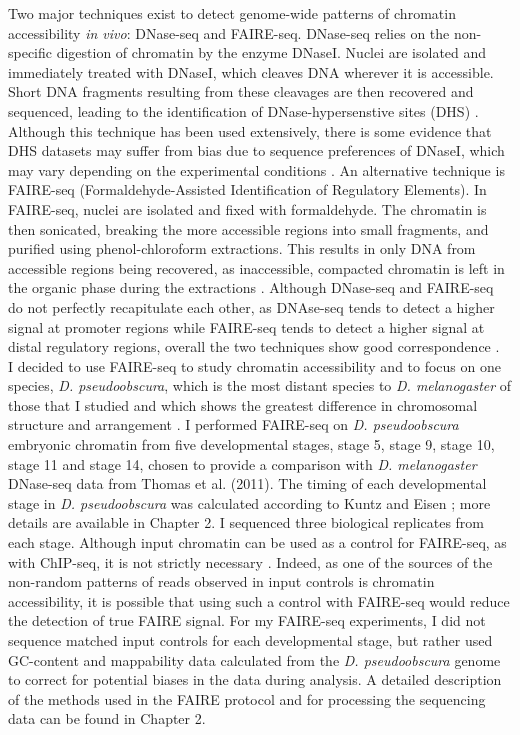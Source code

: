 Two major techniques exist to detect genome-wide patterns of chromatin accessibility \emph{in vivo}: DNase-seq and FAIRE-seq. DNase-seq relies on the non-specific digestion of chromatin by the enzyme DNaseI. Nuclei are isolated and immediately treated with DNaseI, which cleaves DNA wherever it is accessible. Short DNA fragments resulting from these cleavages are then recovered and sequenced, leading to the identification of DNase-hypersenstive sites (DHS) \citep{thomas_dynamic_2011}. Although this technique has been used extensively, there is some evidence that DHS datasets may suffer from bias due to sequence preferences of DNaseI, which may vary depending on the experimental conditions \citep{koohy_chromatin_2013}. An alternative technique is FAIRE-seq (Formaldehyde-Assisted Identification of Regulatory Elements). In FAIRE-seq, nuclei are isolated and fixed with formaldehyde. The chromatin is then sonicated, breaking the more accessible regions into small fragments, and purified using phenol-chloroform extractions. This results in only DNA from accessible regions being recovered, as inaccessible, compacted chromatin is left in the organic phase during the extractions \citep{giresi_isolation_2009, simon_using_2012}. Although DNase-seq and FAIRE-seq do not perfectly recapitulate each other, as DNAse-seq tends to detect a higher signal at promoter regions while FAIRE-seq tends to detect a higher signal at distal regulatory regions, overall the two techniques show good correspondence \citep{koohy_chromatin_2013, mckay_common_2013}.\\
   
I decided to use FAIRE-seq to study chromatin accessibility and to focus on one species, \emph{D. pseudoobscura}, which is the most distant species to \emph{D. melanogaster} of those that I studied and which shows the greatest difference in chromosomal structure and arrangement \citep{clark_evolution_2007,richards_comparative_2005}. I performed FAIRE-seq on \emph{D. pseudoobscura} embryonic chromatin from five developmental stages, stage 5, stage 9, stage 10, stage 11 and stage 14, chosen to provide a comparison with \emph{D. melanogaster} DNase-seq data from Thomas et al. (2011). The timing of each developmental stage in \emph{D. pseudoobscura} was calculated according to Kuntz and Eisen \citet{kuntz_native_2013}; more details are available in Chapter 2. I sequenced three biological replicates from each stage. Although input chromatin can be used as a control for FAIRE-seq, as with ChIP-seq, it is not strictly necessary \citep{simon_using_2012}. Indeed, as one of the sources of the non-random patterns of reads observed in input controls is chromatin accessibility, it is possible that using such a control with FAIRE-seq would reduce the detection of true FAIRE signal. For my FAIRE-seq experiments, I did not sequence matched input controls for each developmental stage, but rather used GC-content and mappability data calculated from the \emph{D. pseudoobscura} genome to correct for potential biases in the data during analysis. A detailed description of the methods used in the FAIRE protocol and for processing the sequencing data can be found in Chapter 2.

